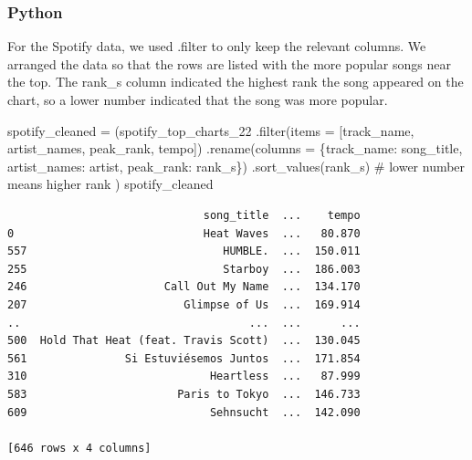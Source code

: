 \documentclass[
  letterpaper,
  DIV=11,
  numbers=noendperiod]{scrreprt}
\newenvironment{Shaded}{\begin{snugshade}}{\end{snugshade}}
\newcommand{\BuiltInTok}[1]{\textcolor[rgb]{0.00,0.23,0.31}{#1}}
\newcommand{\CommentTok}[1]{\textcolor[rgb]{0.37,0.37,0.37}{#1}}
\newcommand{\NormalTok}[1]{\textcolor[rgb]{0.00,0.23,0.31}{#1}}
\newcommand{\OperatorTok}[1]{\textcolor[rgb]{0.37,0.37,0.37}{#1}}
\newcommand{\StringTok}[1]{\textcolor[rgb]{0.13,0.47,0.30}{#1}}
\begin{document}
\subsubsection{Python}

For the Spotify data, we used .filter to only keep the relevant columns.
We arranged the data so that the rows are listed with the more popular
songs near the top. The rank\_s column indicated the highest rank the
song appeared on the chart, so a lower number indicated that the song
was more popular.

\begin{Shaded}
\begin{Highlighting}[]
\NormalTok{spotify\_cleaned }\OperatorTok{=}\NormalTok{ (spotify\_top\_charts\_22}
\NormalTok{                   .}\BuiltInTok{filter}\NormalTok{(items }\OperatorTok{=}\NormalTok{ [}\StringTok{\textquotesingle{}track\_name\textquotesingle{}}\NormalTok{, }\StringTok{\textquotesingle{}artist\_names\textquotesingle{}}\NormalTok{, }\StringTok{\textquotesingle{}peak\_rank\textquotesingle{}}\NormalTok{, }\StringTok{\textquotesingle{}tempo\textquotesingle{}}\NormalTok{])}
\NormalTok{                   .rename(columns }\OperatorTok{=}\NormalTok{ \{}\StringTok{\textquotesingle{}track\_name\textquotesingle{}}\NormalTok{: }\StringTok{\textquotesingle{}song\_title\textquotesingle{}}\NormalTok{,}
                                      \StringTok{\textquotesingle{}artist\_names\textquotesingle{}}\NormalTok{: }\StringTok{\textquotesingle{}artist\textquotesingle{}}\NormalTok{,}
                                      \StringTok{\textquotesingle{}peak\_rank\textquotesingle{}}\NormalTok{: }\StringTok{\textquotesingle{}rank\_s\textquotesingle{}}\NormalTok{\})}
\NormalTok{                   .sort\_values(}\StringTok{\textquotesingle{}rank\_s\textquotesingle{}}\NormalTok{) }\CommentTok{\# lower number means higher rank}
\NormalTok{                  )}
\NormalTok{spotify\_cleaned}
\end{Highlighting}
\end{Shaded}

\begin{verbatim}
                              song_title  ...    tempo
0                             Heat Waves  ...   80.870
557                              HUMBLE.  ...  150.011
255                              Starboy  ...  186.003
246                     Call Out My Name  ...  134.170
207                        Glimpse of Us  ...  169.914
..                                   ...  ...      ...
500  Hold That Heat (feat. Travis Scott)  ...  130.045
561               Si Estuviésemos Juntos  ...  171.854
310                            Heartless  ...   87.999
583                       Paris to Tokyo  ...  146.733
609                            Sehnsucht  ...  142.090

[646 rows x 4 columns]
\end{verbatim}
\end{document}
